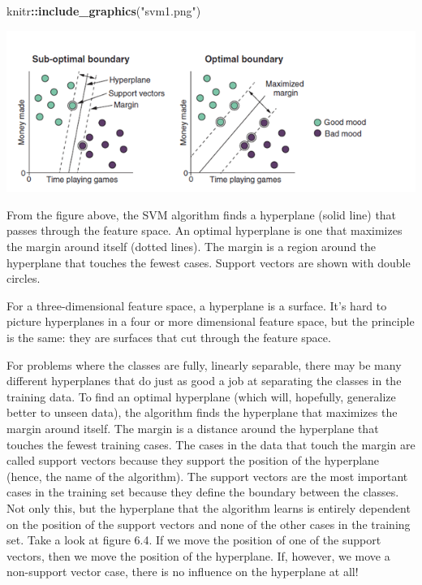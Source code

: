 \documentclass[
]{article}
\newenvironment{Shaded}{\begin{snugshade}}{\end{snugshade}}
\newcommand{\FunctionTok}[1]{\textcolor[rgb]{0.13,0.29,0.53}{\textbf{#1}}}
\newcommand{\NormalTok}[1]{#1}
\newcommand{\SpecialCharTok}[1]{\textcolor[rgb]{0.81,0.36,0.00}{\textbf{#1}}}
\newcommand{\StringTok}[1]{\textcolor[rgb]{0.31,0.60,0.02}{#1}}
\begin{document}
\begin{Shaded}
\begin{Highlighting}[]
\NormalTok{knitr}\SpecialCharTok{::}\FunctionTok{include\_graphics}\NormalTok{(}\StringTok{"svm1.png"}\NormalTok{)}
\end{Highlighting}
\end{Shaded}

\includegraphics[width=8.67in]{svm1}

From the figure above, the SVM algorithm finds a hyperplane (solid line)
that passes through the feature space. An optimal hyperplane is one that
maximizes the margin around itself (dotted lines). The margin is a
region around the hyperplane that touches the fewest cases. Support
vectors are shown with double circles.

For a three-dimensional feature space, a hyperplane is a surface. It's
hard to picture hyperplanes in a four or more dimensional feature space,
but the principle is the same: they are surfaces that cut through the
feature space.

For problems where the classes are fully, linearly separable, there may
be many different hyperplanes that do just as good a job at separating
the classes in the training data. To find an optimal hyperplane (which
will, hopefully, generalize better to unseen data), the algorithm finds
the hyperplane that maximizes the margin around itself. The margin is a
distance around the hyperplane that touches the fewest training cases.
The cases in the data that touch the margin are called support vectors
because they support the position of the hyperplane (hence, the name of
the algorithm). The support vectors are the most important cases in the
training set because they define the boundary between the classes. Not
only this, but the hyperplane that the algorithm learns is entirely
dependent on the position of the support vectors and none of the other
cases in the training set. Take a look at figure 6.4. If we move the
position of one of the support vectors, then we move the position of the
hyperplane. If, however, we move a non-support vector case, there is no
influence on the hyperplane at all!
\end{document}

